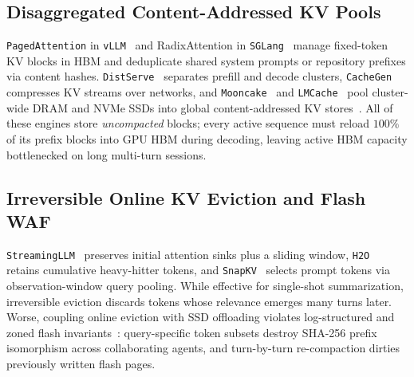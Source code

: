 \documentclass[10pt,journal,compsoc]{IEEEtran}
\theoremstyle{definition}
\theoremstyle{remark}
\begin{document}
\subsection{Disaggregated Content-Addressed KV Pools}
\texttt{PagedAttention} in \texttt{vLLM}~\cite{kwon2023vllm} and RadixAttention in \texttt{SGLang}~\cite{zheng2024sglang} manage fixed-token KV blocks in HBM and deduplicate shared system prompts or repository prefixes via content hashes. \texttt{DistServe}~\cite{zhong2024distserve} separates prefill and decode clusters, \texttt{CacheGen}~\cite{liu2024cachegen} compresses KV streams over networks, and \texttt{Mooncake}~\cite{qin2025mooncake} and \texttt{LMCache}~\cite{cheng2025lmcache} pool cluster-wide DRAM and NVMe SSDs into global content-addressed KV stores~\cite{quinlan2002venti}. All of these engines store \emph{uncompacted} blocks; every active sequence must reload $100\%$ of its prefix blocks into GPU HBM during decoding, leaving active HBM capacity bottlenecked on long multi-turn sessions.

\subsection{Irreversible Online KV Eviction and Flash WAF}
\texttt{StreamingLLM}~\cite{xiao2024streamingllm} preserves initial attention sinks plus a sliding window, \texttt{H2O}~\cite{zhang2023h2o} retains cumulative heavy-hitter tokens, and \texttt{SnapKV}~\cite{li2024snapkv} selects prompt tokens via observation-window query pooling. While effective for single-shot summarization, irreversible eviction discards tokens whose relevance emerges many turns later. Worse, coupling online eviction with SSD offloading violates log-structured and zoned flash invariants~\cite{rosenblum1992lfs,hu2009waf,bjorling2021zns}: query-specific token subsets destroy SHA-256 prefix isomorphism across collaborating agents, and turn-by-turn re-compaction dirties previously written flash pages.
\end{document}
